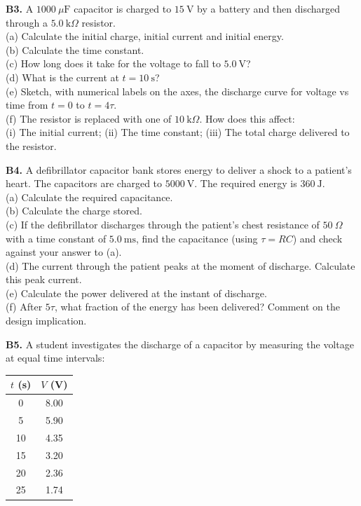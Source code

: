 \begin{exercisebox}[22]
\vspace{0.4cm}

\textbf{B3.} A $1000\ \mu\text{F}$ capacitor is
charged to $15\ \text{V}$ by a battery and then
discharged through a $5.0\ \text{k}\Omega$ resistor.\\[4pt]
(a) Calculate the initial charge, initial current
and initial energy.\\
(b) Calculate the time constant.\\
(c) How long does it take for the voltage to fall
to $5.0\ \text{V}$?\\
(d) What is the current at $t = 10\ \text{s}$?\\
(e) Sketch, with numerical labels on the axes,
the discharge curve for voltage vs time from
$t = 0$ to $t = 4\tau$.\\
(f) The resistor is replaced with one of
$10\ \text{k}\Omega$. How does this affect:\\
(i) The initial current; (ii) The time constant;
(iii) The total charge delivered to the resistor.
\hfill{}

\vspace{0.4cm}

\textbf{B4.} A defibrillator capacitor bank stores
energy to deliver a shock to a patient's heart.
The capacitors are charged to $5000\ \text{V}$.
The required energy is $360\ \text{J}$.\\[4pt]
(a) Calculate the required capacitance.\\
(b) Calculate the charge stored.\\
(c) If the defibrillator discharges through the
patient's chest resistance of $50\ \Omega$ with a
time constant of $5.0\ \text{ms}$, find the
capacitance (using $\tau = RC$) and check against
your answer to (a).\\
(d) The current through the patient peaks at the
moment of discharge. Calculate this peak current.\\
(e) Calculate the power delivered at the instant
of discharge.\\
(f) After $5\tau$, what fraction of the energy
has been delivered? Comment on the design
implication.
\hfill{}

\vspace{0.4cm}

\textbf{B5.} A student investigates the discharge
of a capacitor by measuring the voltage at equal
time intervals:

\begin{center}
\begin{tabular}{cc}
\toprule
$t$ (s) & $V$ (V)\\
\midrule
0 & 8.00\\
5 & 5.90\\
10 & 4.35\\
15 & 3.20\\
20 & 2.36\\
25 & 1.74\\
\bottomrule
\end{tabular}
\end{center}


\end{exercisebox}
